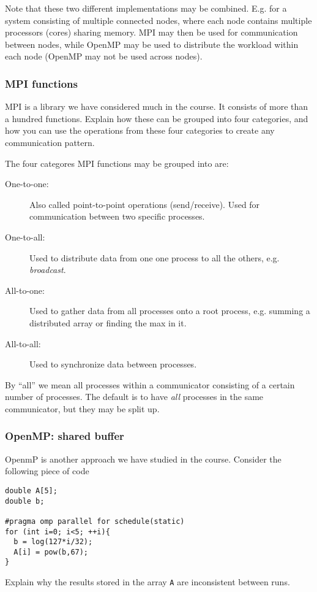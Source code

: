 Note that these two different implementations may be combined. E.g. for a system consisting of multiple connected nodes, where each node contains multiple processors (cores) sharing memory. MPI may then be used for communication between nodes, while OpenMP may be used to distribute the workload within each node (OpenMP may not be used across nodes).

\subsubsection{MPI functions} %
\label{ssub:mpi_functions}

\begin{question}
  MPI is a library we have considered much in the course. It consists of more than a hundred functions. Explain how these can be grouped into four categories, and how you can use the operations from these four categories to create any communication pattern.
\end{question}

The four categores MPI functions may be grouped into are:
\begin{description}
  \item[One-to-one:] Also called point-to-point operations (send/receive). Used for communication between two specific processes.
  \item[One-to-all:] Used to distribute data from one one process to all the others, e.g. \emph{broadcast}.
  \item[All-to-one:] Used to gather data from all processes onto a root process, e.g. summing a distributed array or finding the max in it.
  \item[All-to-all:] Used to synchronize data between processes.
\end{description}
By ``all'' we mean all processes within a communicator consisting of a certain number of processes. The default is to have \emph{all} processes in the same communicator, but they may be split up.

\subsubsection{OpenMP: shared buffer} %
\label{ssub:openmp_shared_buffer}

\begin{question}
  OpenmP is another approach we have studied in the course. Consider the following piece of code
  \begin{lstlisting}
double A[5];
double b;

#pragma omp parallel for schedule(static)
for (int i=0; i<5; ++i){
  b = log(127*i/32);
  A[i] = pow(b,67);
}
  \end{lstlisting}
  Explain why the results stored in the array \texttt{A} are inconsistent between runs.
\end{question}

